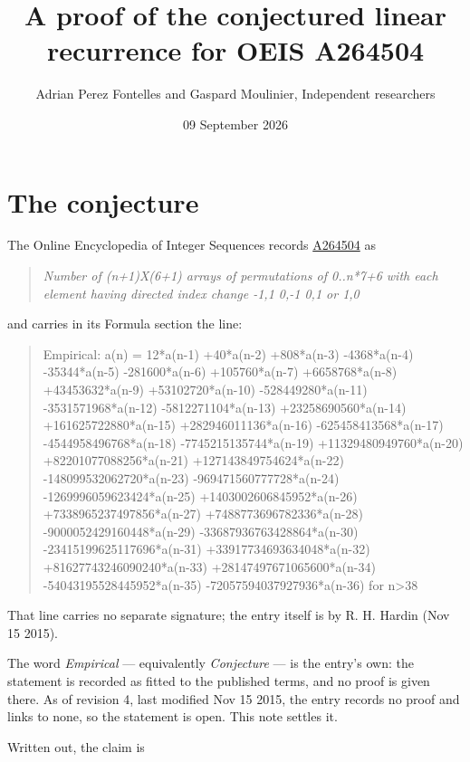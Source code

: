 \documentclass[11pt]{article}
\title{A proof of the conjectured linear recurrence for OEIS A264504}
\author{Adrian Perez Fontelles and Gaspard Moulinier, Independent researchers}
\date{09 September 2026}
\theoremstyle{definition}
\begin{document}
\maketitle
\section{The conjecture}

The Online Encyclopedia of Integer Sequences records \href{https://oeis.org/A264504}{A264504} as

\begin{quote}\itshape Number of (n+1)X(6+1) arrays of permutations of 0..n*7+6 with each element having directed index change -1,1 0,-1 0,1 or 1,0\end{quote}

and carries in its Formula section the line:

\begin{quote}\ttfamily Empirical: a(n) = 12*a(n-1) +40*a(n-2) +808*a(n-3) -4368*a(n-4) -35344*a(n-5) -281600*a(n-6) +105760*a(n-7) +6658768*a(n-8) +43453632*a(n-9) +53102720*a(n-10) -528449280*a(n-11) -3531571968*a(n-12) -5812271104*a(n-13) +23258690560*a(n-14) +161625722880*a(n-15) +282946011136*a(n-16) -625458413568*a(n-17) -4544958496768*a(n-18) -7745215135744*a(n-19) +11329480949760*a(n-20) +82201077088256*a(n-21) +127143849754624*a(n-22) -148099532062720*a(n-23) -969471560777728*a(n-24) -1269996059623424*a(n-25) +1403002606845952*a(n-26) +7338965237497856*a(n-27) +7488773696782336*a(n-28) -9000052429160448*a(n-29) -33687936763428864*a(n-30) -23415199625117696*a(n-31) +33917734693634048*a(n-32) +81627743246090240*a(n-33) +28147497671065600*a(n-34) -54043195528445952*a(n-35) -72057594037927936*a(n-36) for n>38\end{quote}

That line carries no separate signature; the entry itself is by R. H. Hardin (Nov 15 2015).

The word {\itshape Empirical} --- equivalently {\itshape Conjecture} --- is the entry's own: the statement is recorded as fitted to the published terms, and no proof is given there. As of revision 4, last modified Nov 15 2015, the entry records no proof and links to none, so the statement is open. This note settles it.

Written out, the claim is
\end{document}
